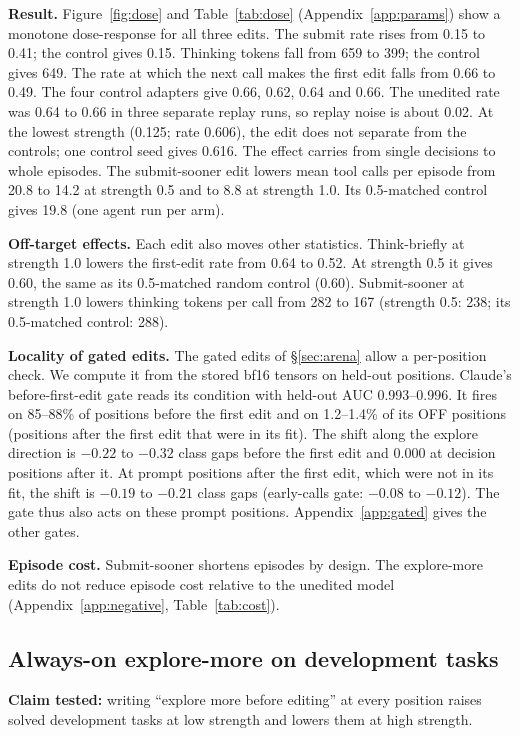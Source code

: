 \textbf{Result.} Figure~\ref{fig:dose} and Table~\ref{tab:dose} (Appendix~\ref{app:params}) show a monotone dose-response for all three edits. The submit rate rises from 0.15 to 0.41; the control gives 0.15. Thinking tokens fall from 659 to 399; the control gives 649. The rate at which the next call makes the first edit falls from 0.66 to 0.49. The four control adapters give 0.66, 0.62, 0.64 and 0.66. The unedited rate was 0.64 to 0.66 in three separate replay runs, so replay noise is about 0.02. At the lowest strength (0.125; rate 0.606), the edit does not separate from the controls; one control seed gives 0.616. The effect carries from single decisions to whole episodes. The submit-sooner edit lowers mean tool calls per episode from 20.8 to 14.2 at strength 0.5 and to 8.8 at strength 1.0. Its 0.5-matched control gives 19.8 (one agent run per arm).

\textbf{Off-target effects.} Each edit also moves other statistics. Think-briefly at strength 1.0 lowers the first-edit rate from 0.64 to 0.52. At strength 0.5 it gives 0.60, the same as its 0.5-matched random control (0.60). Submit-sooner at strength 1.0 lowers thinking tokens per call from 282 to 167 (strength 0.5: 238; its 0.5-matched control: 288).

\textbf{Locality of gated edits.} The gated edits of \S\ref{sec:arena} allow a per-position check. We compute it from the stored bf16 tensors on held-out positions. Claude's before-first-edit gate reads its condition with held-out AUC 0.993--0.996. It fires on 85--88\% of positions before the first edit and on 1.2--1.4\% of its OFF positions (positions after the first edit that were in its fit). The shift along the explore direction is $-0.22$ to $-0.32$ class gaps before the first edit and 0.000 at decision positions after it. At prompt positions after the first edit, which were not in its fit, the shift is $-0.19$ to $-0.21$ class gaps (early-calls gate: $-0.08$ to $-0.12$). The gate thus also acts on these prompt positions. Appendix~\ref{app:gated} gives the other gates.

\textbf{Episode cost.} Submit-sooner shortens episodes by design. The explore-more edits do not reduce episode cost relative to the unedited model (Appendix~\ref{app:negative}, Table~\ref{tab:cost}).

\subsection{Always-on explore-more on development tasks}
\label{sec:devgain}
\textbf{Claim tested:} writing ``explore more before editing'' at every position raises solved development tasks at low strength and lowers them at high strength.

